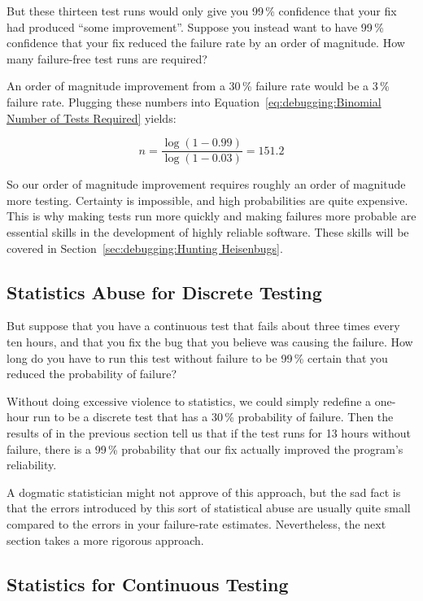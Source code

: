 But these thirteen test runs would only give you 99\,\% confidence that
your fix had produced ``some improvement''.
Suppose you instead want to have 99\,\% confidence that your fix reduced
the failure rate by an order of magnitude.
How many failure-free test runs are required?

An order of magnitude improvement from a 30\,\% failure rate would be
a 3\,\% failure rate.
Plugging these numbers into
Equation~\ref{eq:debugging:Binomial Number of Tests Required} yields:

\begin{equation}
	n = \frac{\log\left(1 - 0.99\right)}{\log\left(1 - 0.03\right)} = 151.2
\end{equation}

So our order of magnitude improvement requires roughly an order of
magnitude more testing.
Certainty is impossible, and high probabilities are quite expensive.
This is why making tests run more quickly and making failures more
probable are essential skills in the development of highly reliable
software.
These skills will be covered in
Section~\ref{sec:debugging:Hunting Heisenbugs}.

\subsection{Statistics Abuse for Discrete Testing}
\label{sec:debugging:Statistics Abuse for Discrete Testing}

But suppose that you have a continuous test that fails about three
times every ten hours, and that you fix the bug that you believe was
causing the failure.
How long do you have to run this test without failure to be 99\,\% certain
that you reduced the probability of failure?

Without doing excessive violence to statistics, we could simply
redefine a one-hour run to be a discrete test that has a 30\,\%
probability of failure.
Then the results of in the previous section tell us that if the test
runs for 13 hours without failure, there is a 99\,\% probability that
our fix actually improved the program's reliability.

A dogmatic statistician might not approve of this approach, but the sad
fact is that the errors introduced by this sort of statistical abuse are
usually quite small compared to the errors in your failure-rate estimates.
Nevertheless, the next section takes a more rigorous approach.

\subsection{Statistics for Continuous Testing}
\label{sec:debuggingStatistics for Continuous Testing}

